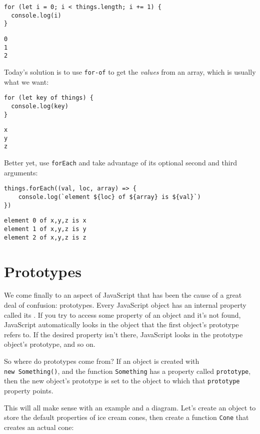 \begin{verbatim}
for (let i = 0; i < things.length; i += 1) {
  console.log(i)
}
\end{verbatim}

\begin{verbatim}
0
1
2
\end{verbatim}

Today's solution is to use \texttt{for-of} to get the \emph{values} from an array,
which is usually what we want:

\begin{verbatim}
for (let key of things) {
  console.log(key)
}
\end{verbatim}

\begin{verbatim}
x
y
z
\end{verbatim}

\noindent
Better yet, use \texttt{forEach} and take advantage of its optional second and third arguments:

\begin{verbatim}
things.forEach((val, loc, array) => {
    console.log(`element ${loc} of ${array} is ${val}`)
})
\end{verbatim}

\begin{verbatim}
element 0 of x,y,z is x
element 1 of x,y,z is y
element 2 of x,y,z is z
\end{verbatim}

\section{Prototypes}\label{s:legacy-prototypes}

We come finally to an aspect of JavaScript that has been the cause of a great deal of confusion: prototypes.
Every JavaScript object has an internal property called its .
If you try to access some property of an object and it's not found,
JavaScript automatically looks in the object that the first object's prototype refers to.
If the desired property isn't there,
JavaScript looks in the prototype object's prototype, and so on.

So where do prototypes come from?
If an object is created with \texttt{new\ Something()},
and the function \texttt{Something} has a property called \texttt{prototype},
then the new object's prototype is set to the object to which that
\texttt{prototype} property points.

This will all make sense with an example and a diagram.
Let's create an object to store the default properties of ice cream cones,
then create a function \texttt{Cone} that creates an actual cone:

